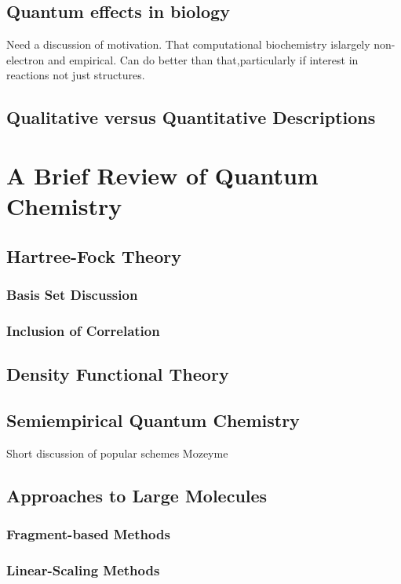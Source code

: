 \documentclass[oneside,12pt]{book}
\begin{document}
\section{Quantum effects in biology}
Need a discussion of motivation.  That computational biochemistry
islargely non-electron and empirical.  Can do better than
that,particularly if interest in reactions not just structures.

\section{Qualitative versus Quantitative Descriptions}

\chapter{A Brief Review of Quantum Chemistry}
\section{Hartree-Fock Theory}

\subsection{Basis Set Discussion}
\subsection{Inclusion of Correlation}
\section{Density Functional Theory}
\section{Semiempirical Quantum Chemistry}
Short discussion of popular schemes
Mozeyme

\section{Approaches to Large Molecules}

\subsection{Fragment-based Methods}
\subsection{Linear-Scaling Methods}
\end{document}
